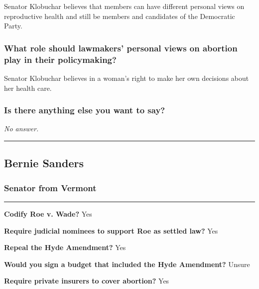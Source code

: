 Senator Klobuchar believes that members can have different personal
views on reproductive health and still be members and candidates of the
Democratic Party.

\hypertarget{what-role-should-lawmakers-personal-views-on-abortion-play-in-their-policymaking-3}{%
\subsubsection{What role should lawmakers' personal views on abortion
play in their
policymaking?}\label{what-role-should-lawmakers-personal-views-on-abortion-play-in-their-policymaking-3}}

Senator Klobuchar believes in a woman's right to make her own decisions
about her health care.

\hypertarget{is-there-anything-else-you-want-to-say-3}{%
\subsubsection{Is there anything else you want to
say?}\label{is-there-anything-else-you-want-to-say-3}}

\emph{No answer.}

\begin{center}\rule{0.5\linewidth}{\linethickness}\end{center}

\hypertarget{bernie-sanders}{%
\subsection{Bernie Sanders}\label{bernie-sanders}}

\hypertarget{senator-from-vermont}{%
\subsubsection{Senator from Vermont}\label{senator-from-vermont}}

\begin{center}\rule{0.5\linewidth}{\linethickness}\end{center}

\textbf{Codify Roe v. Wade?} Yes

\textbf{Require judicial nominees to support Roe as settled law?} Yes

\textbf{Repeal the Hyde Amendment?} Yes

\textbf{Would you sign a budget that included the Hyde Amendment?}
Unsure

\textbf{Require private insurers to cover abortion?} Yes

